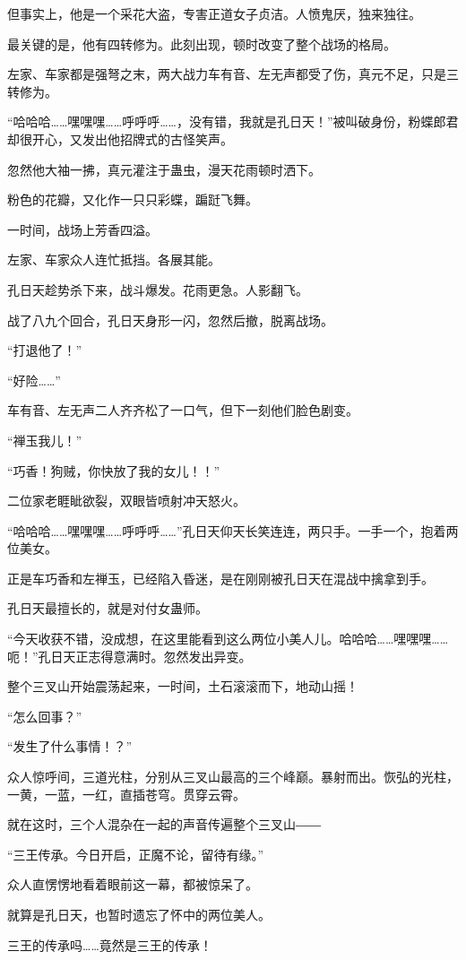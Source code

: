 \begin{this_body}
但事实上，他是一个采花大盗，专害正道女子贞洁。人愤鬼厌，独来独往。

最关键的是，他有四转修为。此刻出现，顿时改变了整个战场的格局。

左家、车家都是强弩之末，两大战力车有音、左无声都受了伤，真元不足，只是三转修为。

“哈哈哈……嘿嘿嘿……呼呼呼……，没有错，我就是孔日天！”被叫破身份，粉蝶郎君却很开心，又发出他招牌式的古怪笑声。

忽然他大袖一拂，真元灌注于蛊虫，漫天花雨顿时洒下。

粉色的花瓣，又化作一只只彩蝶，蹁跹飞舞。

一时间，战场上芳香四溢。

左家、车家众人连忙抵挡。各展其能。

孔日天趁势杀下来，战斗爆发。花雨更急。人影翻飞。

战了八九个回合，孔日天身形一闪，忽然后撤，脱离战场。

“打退他了！”

“好险……”

车有音、左无声二人齐齐松了一口气，但下一刻他们脸色剧变。

“禅玉我儿！”

“巧香！狗贼，你快放了我的女儿！！”

二位家老睚眦欲裂，双眼皆喷射冲天怒火。

“哈哈哈……嘿嘿嘿……呼呼呼……”孔日天仰天长笑连连，两只手。一手一个，抱着两位美女。

正是车巧香和左禅玉，已经陷入昏迷，是在刚刚被孔日天在混战中擒拿到手。

孔日天最擅长的，就是对付女蛊师。

“今天收获不错，没成想，在这里能看到这么两位小美人儿。哈哈哈……嘿嘿嘿……呃！”孔日天正志得意满时。忽然发出异变。

整个三叉山开始震荡起来，一时间，土石滚滚而下，地动山摇！

“怎么回事？”

“发生了什么事情！？”

众人惊呼间，三道光柱，分别从三叉山最高的三个峰巅。暴射而出。恢弘的光柱，一黄，一蓝，一红，直插苍穹。贯穿云霄。

就在这时，三个人混杂在一起的声音传遍整个三叉山――

“三王传承。今日开启，正魔不论，留待有缘。”

众人直愣愣地看着眼前这一幕，都被惊呆了。

就算是孔日天，也暂时遗忘了怀中的两位美人。

三王的传承吗……竟然是三王的传承！


\end{this_body}

